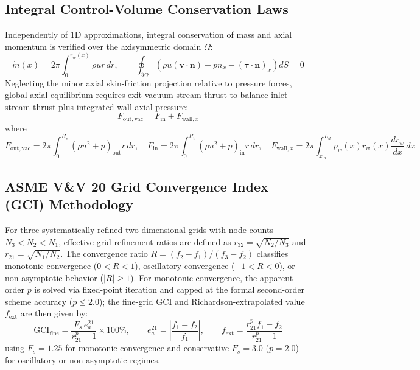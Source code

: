 \documentclass[11pt,a4paper]{article}
\begin{document}
\subsection{Integral Control-Volume Conservation Laws}
Independently of 1D approximations, integral conservation of mass and axial momentum is verified over the axisymmetric domain $\Omega$:
\begin{equation}
\dot{m}(x) = 2\pi \int_{0}^{r_w(x)} \rho u r \, dr, \qquad
\oint_{\partial \Omega} \left( \rho u (\mathbf{v} \cdot \mathbf{n}) + p n_x - (\boldsymbol{\tau} \cdot \mathbf{n})_x \right) dS = 0
\end{equation}
Neglecting the minor axial skin-friction projection relative to pressure forces, global axial equilibrium requires exit vacuum stream thrust to balance inlet stream thrust plus integrated wall axial pressure:
\begin{equation}
F_{\mathrm{out,vac}} = F_{\mathrm{in}} + F_{\mathrm{wall},x}
\end{equation}
where
\begin{equation}
F_{\mathrm{out,vac}} = 2\pi \int_{0}^{R_e} (\rho u^2 + p)_{\mathrm{out}} r \, dr, \quad
F_{\mathrm{in}} = 2\pi \int_{0}^{R_c} (\rho u^2 + p)_{\mathrm{in}} r \, dr, \quad
F_{\mathrm{wall},x} = 2\pi \int_{x_{\mathrm{in}}}^{L_d} p_w(x) r_w(x) \frac{dr_w}{dx} \, dx
\end{equation}

\subsection{ASME V\&V 20 Grid Convergence Index (GCI) Methodology}
For three systematically refined two-dimensional grids with node counts $N_3 < N_2 < N_1$, effective grid refinement ratios are defined as $r_{32} = \sqrt{N_2/N_3}$ and $r_{21} = \sqrt{N_1/N_2}$. The convergence ratio $R = (f_2 - f_1)/(f_3 - f_2)$ classifies monotonic convergence ($0 < R < 1$), oscillatory convergence ($-1 < R < 0$), or non-asymptotic behavior ($|R| \ge 1$). For monotonic convergence, the apparent order $p$ is solved via fixed-point iteration and capped at the formal second-order scheme accuracy ($p \le 2.0$); the fine-grid GCI and Richardson-extrapolated value $f_{\mathrm{ext}}$ are then given by:
\begin{equation}
\mathrm{GCI}_{\mathrm{fine}} = \frac{F_s \, e_a^{21}}{r_{21}^p - 1} \times 100\%, \qquad
e_a^{21} = \left|\frac{f_1 - f_2}{f_1}\right|, \qquad
f_{\mathrm{ext}} = \frac{r_{21}^p f_1 - f_2}{r_{21}^p - 1}
\end{equation}
using $F_s = 1.25$ for monotonic convergence and conservative $F_s = 3.0$ ($p = 2.0$) for oscillatory or non-asymptotic regimes.
\end{document}
